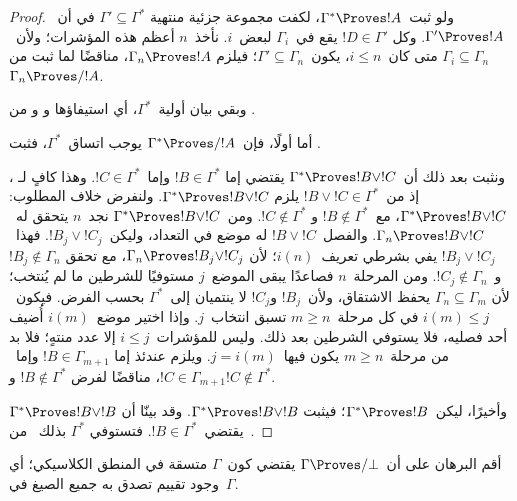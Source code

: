 \documentclass[../../../include/open-logic-section]{subfiles}
\begin{document}
\begin{proof}
  ولو ثبت~$\Gamma^* \Proves !A$، لكفت مجموعة جزئية منتهية
  $\Gamma'\subseteq\Gamma^*$ في أن~$\Gamma'\Proves !A$. وكل
  $!D\in\Gamma'$ يقع في~$\Gamma_i$ لبعض~$i$. نأخذ~$n$ أعظم
  هذه المؤشرات؛ ولأن~$\Gamma_i\subseteq\Gamma_n$ متى كان~$i\leq n$،
  يكون~$\Gamma'\subseteq\Gamma_n$؛ فيلزم
  $\Gamma_n\Proves !A$، مناقضًا لما ثبت من
  $\Gamma_n\Proves/!A$.

  وبقي بيان أولية~$\Gamma^*$، أي استيفاؤها
   و و من
  .

  أما أولًا، فإن~$\Gamma^*\Proves/!A$ يوجب اتساق~$\Gamma^*$، فثبت
  .

  ونثبت بعد ذلك أن~$\Gamma^*\Proves !B\lor !C$ يقتضي إما
  $!B\in\Gamma^*$ وإما~$!C\in\Gamma^*$. وهذا كافٍ لـ
  ، إذ من~$!B\lor !C\in\Gamma^*$ يلزم
  $\Gamma^*\Proves !B\lor !C$. ولنفرض خلاف المطلوب:
  $\Gamma^*\Proves !B\lor !C$، مع~$!B\notin\Gamma^*$ و
  $!C\notin\Gamma^*$. ومن~$\Gamma^*\Proves !B\lor !C$ نجد~$n$
  يتحقق له~$\Gamma_n\Proves !B\lor !C$. والفصل~$!B\lor !C$ له موضع
  في التعداد، وليكن~$!B_j\lor !C_j$. فهذا~$!B_j\lor !C_j$ يفي بشرطي
  تعريف~$i(n)$؛ لأن
  $\Gamma_n\Proves !B_j\lor !C_j$، مع تحقق
  $!B_j\notin\Gamma_n$ و~$!C_j\notin\Gamma_n$. ومن المرحلة~$n$
  فصاعدًا يبقى الموضع~$j$ مستوفيًا للشرطين ما لم يُنتخب؛ لأن
  $\Gamma_n\subseteq\Gamma_m$ يحفظ الاشتقاق، ولأن~$!B_j$ و$!C_j$ لا
  ينتميان إلى~$\Gamma^*$ بحسب الفرض. فيكون~$i(m)\leq j$ في كل
  مرحلة~$m\geq n$ تسبق انتخاب~$j$. وإذا اختير موضع~$i(m)$ أُضيف أحد فصليه، فلا
  يستوفي الشرطين بعد ذلك. وليس للمؤشرات~$i\leq j$ إلا عدد منتهٍ؛ فلا بد
  من مرحلة~$m\geq n$ يكون فيها~$j=i(m)$. ويلزم عندئذ إما
  $!B\in\Gamma_{m+1}$ وإما~$!C\in\Gamma_{m+1}$، مناقضًا لفرض
  $!B\notin\Gamma^*$ و$!C\notin\Gamma^*$.

  وأخيرًا، ليكن~$\Gamma^*\Proves !B$؛ فيثبت
  $\Gamma^*\Proves !B\lor !B$. وقد بينّا أن
  $\Gamma^*\Proves !B\lor !B$ يقتضي~$!B\in\Gamma^*$. فتستوفي
  $\Gamma^*$ بذلك~ من~.
\end{proof}

\begin{prob}
أقم البرهان على أن~$\Gamma \Proves/ \bot$ يقتضي كون~$\Gamma$ متسقة في
المنطق الكلاسيكي؛ أي وجود تقييم تصدق به جميع الصيغ في~$\Gamma$.
\end{prob}
\end{document}
